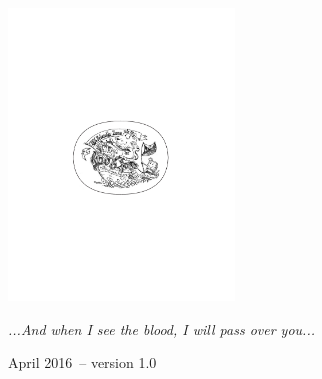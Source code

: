 \documentclass[10pt,oneside,footinclude=true,headinclude=true]{scrbook} %
\begin{document}
\begin{titlepage}
\begin{center}
\large \hfill \vfill

\begingroup
\color{RoyalPurple} \\ \bigskip %
\endgroup

\vfill
\includegraphics[width=6cm]{TFZsuperellipse_bw} \\ \medskip %

\textit{...And when I see the blood, I will pass over you...} \\ \medskip %

April 2016\ -- version 1.0 %

\vfill
\end{center}
\end{titlepage}
    
\newpage
\clearscrheadfoot
\null

\tableofcontents 
\cleardoublepage %
\end{document}
